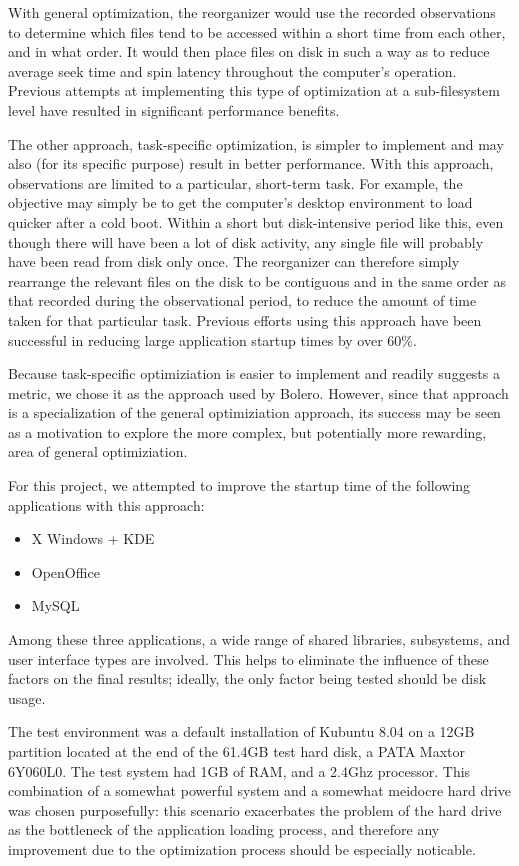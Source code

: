 \documentclass[10pt,twocolumn,letterpaper]{article}
\begin{document}
With general optimization, the reorganizer would use the recorded observations
to determine which files tend to be accessed within a short time from each
other, and in what order. It would then place files on disk in such a way as
to reduce average seek time and spin latency throughout the computer's operation.
Previous attempts at implementing this type of optimization at a
sub-filesystem level have resulted in significant performance benefits\cite{autolocality}.

The other approach, task-specific optimization, is simpler to
implement and may also (for its specific purpose) result in better performance. With this
approach, observations are limited to a particular, short-term task. For example,
the objective may simply be to get the computer's desktop environment to load
quicker after a cold boot. Within a short but disk-intensive period like this, even
though there will have been a lot of disk activity, any single file will
probably have been read from disk only once. The reorganizer can therefore simply
rearrange the relevant files on the disk to be contiguous and in the same order as that
recorded during the observational period, to reduce the amount of time taken for
that particular task. Previous efforts using this approach have been
successful in reducing large application startup times by over 60\%\cite{ala}.

Because task-specific optimiziation is easier to implement and readily suggests
a metric, we chose it as the approach used by Bolero. However, since that approach is a
specialization of the general optimiziation approach, its success may be seen
as a motivation to explore the more complex, but potentially more rewarding, area
of general optimiziation.

For this project, we attempted to improve the startup time of the following applications with this approach:
\begin{itemize}
\item X Windows + KDE
\item OpenOffice
\item MySQL
\end{itemize}
Among these three applications, a wide range of shared libraries, subsystems, and user interface types
are involved. This helps to eliminate the influence of these factors on the final results;
ideally, the only factor being tested should be disk usage.

The test environment was a default installation of Kubuntu 8.04 on a 12GB partition located
at the end of the 61.4GB test hard disk, a PATA Maxtor 6Y060L0. The test system had
1GB of RAM, and a 2.4Ghz processor. This combination of a somewhat powerful system and
a somewhat meidocre hard drive was chosen purposefully: this scenario exacerbates the
problem of the hard drive as the bottleneck of the application loading process, and therefore
any improvement due to the optimization process should be especially noticable.
\end{document}
